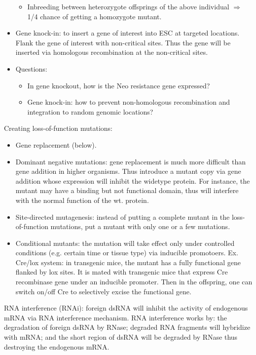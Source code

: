 \documentclass{report}
\begin{document}
\begin{itemize}
\begin{itemize}
		\item Inbreeding between heterozygote offsprings of the above individual $\Rightarrow$ 1/4 chance of getting a homozygote mutant. 
	\end{itemize}
	
	\item Gene knock-in: to insert a gene of interest into ESC at targeted locations. Flank the gene of interest with non-critical sites. Thus the gene will be inserted via homologous recombination at the non-critical sites. 
	
	\item Questions: 
	\begin{itemize}
		\item In gene knockout, how is the Neo resistance gene expressed? 
		\item Gene knock-in: how to prevent non-homologous recombination and integration to random genomic locations? 
	\end{itemize} 
\end{itemize}

Creating loss-of-function mutations: 
\begin{itemize}
	\item Gene replacement (below). 
	
	\item Dominant negative mutations: gene replacement is much more difficult than gene addition in higher organisms. Thus introduce a mutant copy via gene addition whose expression will inhibit the widetype protein. For instance, the mutant may have a binding but not functional domain, thus will interfere with the normal function of the wt. protein.
	
	\item Site-directed mutagenesis: instead of putting a complete mutant in the loss-of-function mutations, put a mutant with only one or a few mutations. 
	
	\item Conditional mutants: the mutation will take effect only under controlled conditions (e.g. certain time or tissue type) via inducible promotoers. Ex. Cre/lox system: in transgenic mice, the mutant has a fully functional gene flanked by lox sites. It is mated with transgenic mice that express Cre recombinase gene under an inducible promoter. Then in the offspring, one can switch on/off Cre to selectively excise the functional gene.	
\end{itemize}

RNA interference (RNAi): foreign dsRNA will inhibit the activity of endogenous mRNA via RNA interference mechanism. RNA interference works by: the degradation of foreign dsRNA by RNase; degraded RNA fragments will hybridize with mRNA; and the short region of dsRNA will be degraded by RNase thus destroying the endogenous mRNA.  
\end{document}
